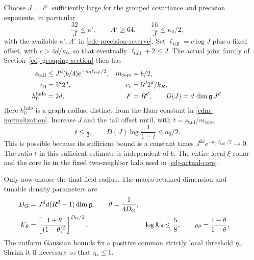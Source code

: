 Choose $J=\ell^j$ sufficiently large for the grouped covariance
and precision exponents, in particular
\begin{equation}
 \frac{32}{J}\le\kappa',\qquad A'\ge64,\qquad
 \frac{16}{J}\le\kappa_0/2,
 \label{cdm-J-choice}
\end{equation}
with the available $\kappa',A'$ in
\eqref{cdc-precision-reserve}. Set
$\ell_{\mathrm{tail}}=c\log J$ plus a fixed offset, with
$c>4d/\kappa_0$, so that eventually
$\ell_{\mathrm{tail}}+2\le J$. The actual joint family of
Section~\ref{cdj-grouping-section} then has
\begin{align}
 s_{\mathrm{tail}}
 &\le J^d(b/4)e^{-\kappa_0\ell_{\mathrm{tail}}/2},
 &m_{\mathrm{core}}&=b/2,\notag\\
 c_0&=5^d2^d,&c_1&=5^d2^d/k_R,\notag\\
 h_0^{\mathrm{halo}}&=2d,&F&=R^d,\qquad
 D(J)=d\,\dim\mathfrak g\,J^d .
 \label{cdm-tail-data}
\end{align}
Here $h_0^{\mathrm{halo}}$ is a graph radius, distinct from the
Haar constant in \eqref{cdm-normalization}. Increase $J$ and
the tail offset until, with $t=s_{\mathrm{tail}}/m_{\mathrm{core}}$,
\begin{equation}
 t\le\tfrac12,\qquad D(J)\log\frac1{1-t}\le a_0/2.
 \label{cdm-tail-budget}
\end{equation}
This is possible because its sufficient bound is a constant
times $J^{2d}e^{-\kappa_0\ell_{\mathrm{tail}}/2}\to0$.
The ratio $t$ in this sufficient estimate is independent of $b$.
The entire local $\xi$ collar and the core lie in the fixed
two-neighbor halo used in \eqref{cdj-actual-core}.

Only now choose the final field radius. The macro retained
dimension and tunable density parameters are
\begin{align}
 D_G&=J^d d(R^d-1)\dim\mathfrak g,\qquad
 \theta=\frac1{4D_G},\notag\\
 \mathcal K_\theta
 &=\left[\frac{1+\theta}{(1-\theta)^3}\right]^{D_G/2},
 &\log\mathcal K_\theta&\le\frac58,\qquad
 \rho_\theta=\frac{1+\theta}{1-\theta}.
 \label{cdm-density-parameters}
\end{align}
The uniform Gaussian bounds fix a positive common strictly
local threshold $\eta_*$. Shrink it if necessary so that
$\eta_*\le1$.

